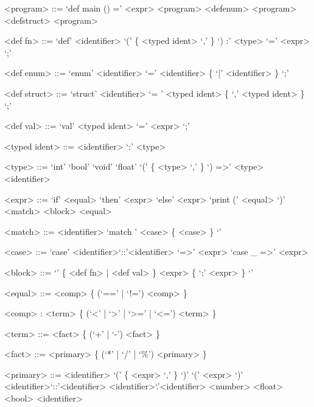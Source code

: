 \begin{grammar}

    <program> ::= `def main () =' <expr>
     <program>
    \alt <defenum> <program>
    \alt <defstruct> <program>

    <def fn> ::= `def' <identifier> `(' \{ <typed ident> `,' \} `) :' <type>  `=' <expr> `;'

    <def enum> ::= `enum' <identifier>  `=' <identifier> \{ `|' <identifier> \} `;'

    <def struct> ::= `struct' <identifier> `= {' <typed ident> \{ `,' <typed ident> \} `};'

    <def val> ::= `val' <typed ident> `=' <expr> `;'

    <typed ident> ::= <identifier> `:' <type>

    <type> ::= `int'
    \alt `bool'
    \alt `void'
    \alt `float'
    \alt `(' \{ <type> `,' \} `) =>' <type>
    \alt <identifier>

    <expr> ::= `if' <equal> `then' <expr> `else' <expr>
    \alt `print (' <equal> `)'
    \alt <match>
    \alt <block>
    \alt <equal>

    <match> ::= <identifier> `match {' <case> \{ <case> \} `}'

    <case> ::= `case' <identifier>`::'<identifier> `=>' <expr>
    \alt `case _ =>' <expr>

    <block> ::= `{' \{ <def fn> | <def val> \} <expr> \{ `;' <expr> \} `}'

    <equal> ::= <comp> \{ (`==' | `!=') <comp> \}

    <comp> : <term> \{ (`<' | `>' | `>=' | `<=') <term> \}

    <term> ::= <fact> \{ (`+' | `-') <fact> \}

    <fact> ::= <primary> \{ (`*' | `/' | `\%') <primary> \}

    <primary> ::= <identifier> `(' \{ <expr> `,' \} `)'
    \alt `(' <expr> `)'
    \alt <identifier>`::'<identifier>
    \alt <identifier>`.'<identifier>
    \alt <number>
    \alt <float>
    \alt <bool>
    \alt <identifier>

\end{grammar}
